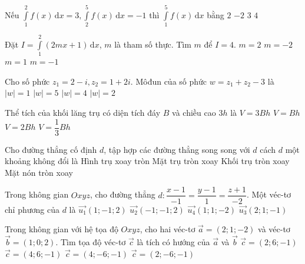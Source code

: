 \begin{ex}%
	Nếu $\displaystyle\int\limits_1^2 f(x)\mathrm{\,d}x=3,\displaystyle\int\limits_2^5 f(x)\mathrm{\,d}x=-1$ thì $\displaystyle\int\limits_1^5 f(x)\mathrm{\,d}x$ bằng
	\choice
	{\True $2$}
	{$-2$}
	{$3$}
	{$4$}
	\loigiai{
	\[\displaystyle\int\limits_1^5 f(x)\mathrm{\,d}x=\displaystyle\int\limits_1^2 f(x)\mathrm{\,d}x+\displaystyle\int\limits_2^5 f(x)\mathrm{\,d}x=3-1=2.\]}
\end{ex}
\begin{ex}%
	Đặt $I=\displaystyle\int\limits_1^2(2mx+1)\mathrm{\,d}x$, $m$ là tham số thực. Tìm $m$ để $I=4$. 
	\choice
	{$m=2$}
	{$m=-2$}
	{\True $m=1$}
	{$m=-1$}
	\loigiai{
	\[I=\displaystyle\int\limits_1^2(2mx+1)\mathrm{\,d}x=\left(mx^2+x\right)\bigg|_1^2 =4m+2-m-1=3m+1 \Rightarrow I=4\Leftrightarrow m=1.\]}
\end{ex}
\begin{ex}%
	Cho số phức $z_1=2-i, z_2=1+2i$. Môđun của số phức $w=z_1+z_2-3$ là
	\choice
	{\True $|w|=1$}
	{$|w|=5$}
	{$|w|=4$}
	{$|w|=2$}
\end{ex}
\begin{ex}%
	Thể tích của khối lăng trụ có diện tích đáy $B$ và chiều cao $3h$ là
	\choice
	{\True $V=3Bh$}
	{$V=Bh$}
	{$V=2Bh$}
	{$V=\dfrac{1}{3}Bh$}
\end{ex}
\begin{ex}%
	Cho đường thẳng cố định $d$, tập hợp các đường thẳng song song với $d$ cách $d$ một khoảng không đổi là
	\choice
	{Hình trụ xoay tròn}
	{\True Mặt trụ tròn xoay}
	{Khối trụ tròn xoay}
	{Mặt nón tròn xoay}
\end{ex}
\begin{ex}%
	Trong không gian $Oxyz$, cho đường thẳng $d\colon\dfrac{x-1}{-1}=\dfrac{y-1}{1}=\dfrac{z+1}{-2}$. Một véc-tơ chỉ phương của $d$ là 
	\choice
	{\True $\overrightarrow{u_1}(1;-1; 2)$}
	{$\overrightarrow{u_2}(-1;-1; 2)$}
	{$\overrightarrow{u_4}(1; 1;-2)$}
	{$\overrightarrow{u_3}(2; 1;-1)$}
\end{ex}
\begin{ex}%
	Trong không gian với hệ tọa độ $Oxyz$, cho hai véc-tơ $\overrightarrow{a}=(2; 1;-2)$ và véc-tơ $\overrightarrow{b}=(1; 0; 2)$. Tìm tọa độ véc-tơ $\overrightarrow{c}$ là tích có hướng của $\overrightarrow{a}$ và $\overrightarrow{b}$ 
	\choice
	{$\overrightarrow{c}=(2; 6;-1)$}
	{$\overrightarrow{c}=(4; 6;-1)$}
	{$\overrightarrow{c}=(4;-6;-1)$}
	{\True $\overrightarrow{c}=(2;-6;-1)$}
\end{ex}
